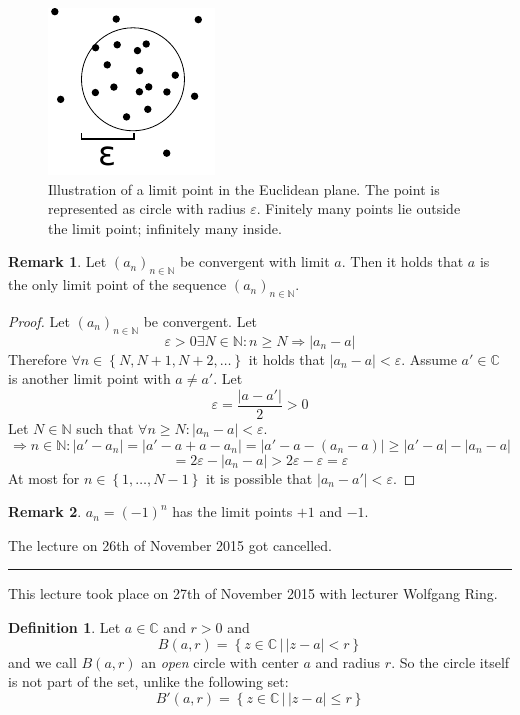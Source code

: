 \documentclass[a4paper,landscape,twocolumn]{article}
\theoremstyle{definition}
\newtheorem{defi}{Definition}
\newtheorem{rem}{Remark}
\newcommand\set[1]{\left\{#1\right\}}
\newcommand\setdef[2]{\left\{#1\,|\,#2\right\}}
\newcommand\abs[1]{\left|#1\right|}
\newcommand\seq[1]{{\left(#1\right)}_{n \in \mathbb N}}
\newcommand\meta[3]{\hrule{} This #1 took place on #2 with lecturer #3.\par}
\begin{document}
\begin{figure}[!t]
  \begin{center}
    \includegraphics{img/limit_point.pdf}
    \caption{
      Illustration of a limit point in the Euclidean plane.
      The point is represented as circle with radius $\varepsilon$.
      Finitely many points lie outside the limit point; infinitely many inside.
    }
  \end{center}
\end{figure}

\begin{rem}
  Let $\seq{a_n}$ be convergent with limit $a$.
  Then it holds that $a$ is the only limit point of the sequence $\seq{a_n}$.
\end{rem}

\begin{proof}
  Let $\seq{a_n}$ be convergent. Let
  \[ \varepsilon > 0 \exists N \in \mathbb N: n \geq N \Rightarrow \abs{a_n - a} \]
  Therefore $\forall n \in \set{N, N+1, N+2, \dots}$ it holds that $\abs{a_n - a} < \varepsilon$.
  Assume $a' \in \mathbb C$ is another limit point with $a \neq a'$.
  Let
  \[ \varepsilon = \frac{\abs{a - a'}}{2} > 0 \]
  Let $N \in \mathbb N$ such that $\forall n \geq N: \abs{a_n - a} < \varepsilon$.
  \[
    \Rightarrow n \in \mathbb N: \abs{a' - a_n}
      = \abs{a' - a + a - a_n}
      = \abs{a' - a - (a_n - a)} \geq \abs{a' - a} - \abs{a_n - a}
  \] \[
      = 2\varepsilon - \abs{a_n - a} > 2\varepsilon - \varepsilon
      = \varepsilon
  \]
  At most for $n \in \set{1, \dots, N-1}$ it is possible that $\abs{a_n - a'} < \varepsilon$.
\end{proof}

\begin{rem}
  $a_n = (-1)^n$ has the limit points $+1$ and $-1$.
\end{rem}

The lecture on 26th of November 2015 got cancelled.

\meta{lecture}{27th of November 2015}{Wolfgang Ring}

\begin{defi}
  Let $a \in \mathbb C$ and $r > 0$ and
  \[ B(a, r) = \setdef{z \in \mathbb C}{\abs{z - a} < r} \]
  and we call $B(a, r)$ an \emph{open} circle with center $a$ and radius $r$.
  So the circle itself is not part of the set, unlike the following set:
  \[ B'(a, r) = \setdef{z \in \mathbb C}{\abs{z - a} \leq r} \]
\end{defi}
\end{document}
